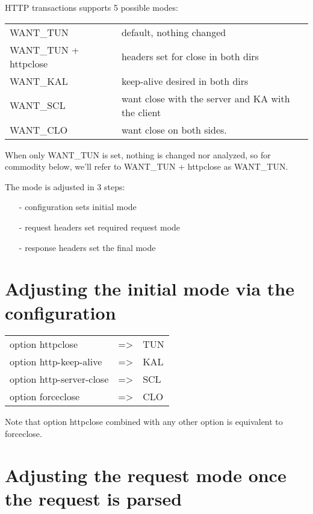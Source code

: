 HTTP transactions supports 5 possible modes:

\vspace{3mm}
\begin{tabular}{ll}
WANT\_TUN             & default, nothing changed \\
WANT\_TUN + httpclose & headers set for close in both dirs \\
WANT\_KAL             & keep-alive desired in both dirs \\
WANT\_SCL             & want close with the server and KA with the client \\
WANT\_CLO             & want close on both sides. \\
\end{tabular}
\vspace{3mm}

When only WANT\_TUN is set, nothing is changed nor analyzed, so for commodity
below, we'll refer to WANT\_TUN + httpclose as WANT\_TUN.

The mode is adjusted in 3 steps:
\begin{itemize}
\item[-] configuration sets initial mode
\item[-] request headers set required request mode
\item[-] response headers set the final mode
\end{itemize}

\section{Adjusting the initial mode via the configuration}

\vspace{3mm}
\begin{tabular}{lcl}
option httpclose         & => & TUN \\
option http-keep-alive   & => & KAL \\
option http-server-close & => & SCL \\
option forceclose        & => & CLO \\
\end{tabular}
\vspace{3mm}

Note that option httpclose combined with any other option is equivalent to
forceclose.

\section{Adjusting the request mode once the request is parsed}

